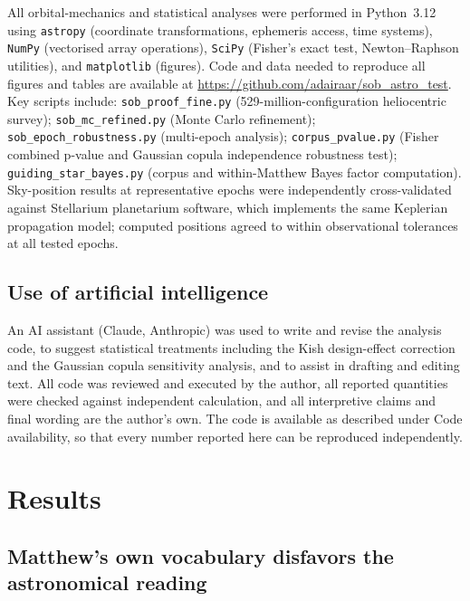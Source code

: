 \documentclass[sn-nature]{sn-jnl}
\begin{document}
All orbital-mechanics and statistical analyses were performed in Python~3.12
using \texttt{astropy}\cite{astropy2022} (coordinate transformations,
ephemeris access, time systems), \texttt{NumPy}\cite{harris2020} (vectorised
array operations), \texttt{SciPy}\cite{virtanen2020} (Fisher's exact test,
Newton--Raphson utilities), and \texttt{matplotlib}\cite{hunter2007}
(figures). Code and data needed to reproduce all figures and tables are
available at \url{https://github.com/adairaar/sob_astro_test}. Key scripts include:
\texttt{sob\_proof\_fine.py} (529-million-configuration heliocentric survey);
\texttt{sob\_mc\_refined.py} (Monte Carlo refinement);
\texttt{sob\_epoch\_robustness.py} (multi-epoch analysis);
\texttt{corpus\_pvalue.py} (Fisher combined p-value and Gaussian copula independence robustness test);
\texttt{guiding\_star\_bayes.py} (corpus and within-Matthew Bayes factor computation).
Sky-position results at representative epochs were independently cross-validated
against Stellarium planetarium software\cite{stellarium2021}, which implements
the same Keplerian propagation model; computed positions agreed to within
observational tolerances at all tested epochs.

\subsection{Use of artificial intelligence}

An AI assistant (Claude, Anthropic) was used to write and revise the analysis
code, to suggest statistical treatments including the Kish design-effect
correction and the Gaussian copula sensitivity analysis, and to assist in
drafting and editing text. All code was reviewed and executed by the author,
all reported quantities were checked against independent calculation, and all
interpretive claims and final wording are the author's own. The code is
available as described under Code availability, so that every number reported
here can be reproduced independently.

\section{Results}\label{sec:results}

\subsection{Matthew's own vocabulary disfavors the astronomical reading}
\label{subsec:within_matthew_results}
\end{document}
